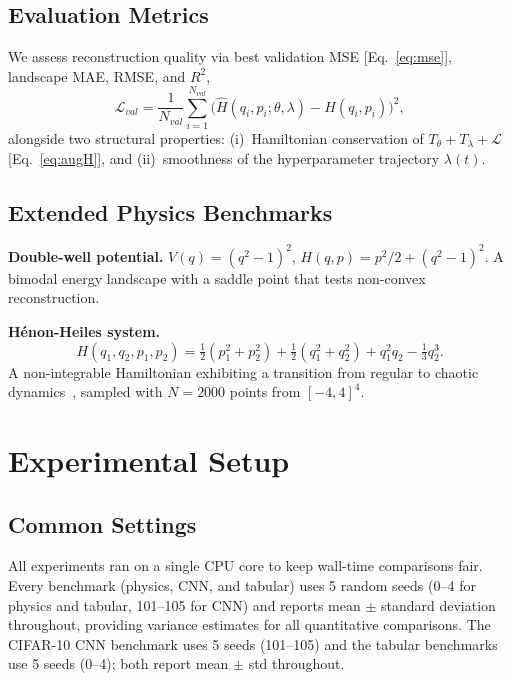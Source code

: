 \documentclass[11pt]{article}
\theoremstyle{definition}
\begin{document}
\subsection{Evaluation Metrics}

We assess reconstruction quality via best validation MSE
[Eq.~\eqref{eq:mse}], landscape MAE, RMSE, and $R^2$,
\begin{equation}
\mathcal{L}_{val}
= \frac{1}{N_{val}}\sum_{i=1}^{N_{val}}
  \bigl(\hat{H}(q_i,p_i;\theta,\lambda) - H(q_i,p_i)\bigr)^2,
\label{eq:mse}
\end{equation}
alongside two structural properties: (i)~Hamiltonian conservation of
$T_\theta+T_\lambda+\mathcal{L}$ [Eq.~\eqref{eq:augH}], and
(ii)~smoothness of the hyperparameter trajectory $\lambda(t)$.

\subsection{Extended Physics Benchmarks}

\textbf{Double-well potential.}
$V(q)=(q^2-1)^2$, $H(q,p)=p^2/2+(q^2-1)^2$. A bimodal energy
landscape with a saddle point that tests non-convex reconstruction.

\textbf{H\'{e}non-Heiles system.}
\begin{equation*}
H(q_1,q_2,p_1,p_2) = \tfrac{1}{2}(p_1^2+p_2^2)
 + \tfrac{1}{2}(q_1^2+q_2^2) + q_1^2 q_2 - \tfrac{1}{3}q_2^3.
\end{equation*}
A non-integrable Hamiltonian exhibiting a transition from regular to
chaotic dynamics~\cite{henon1964,offen2022learning}, sampled with
$N=2000$ points from $[-4,4]^4$.


\section{Experimental Setup}
\label{sec:setup}

\subsection{Common Settings}

All experiments ran on a single CPU core to keep wall-time
comparisons fair. Every benchmark (physics, CNN, and tabular) uses
5 random seeds (0--4 for physics and tabular, 101--105 for CNN) and
reports mean $\pm$ standard deviation throughout, providing variance
estimates for all quantitative comparisons. The CIFAR-10 CNN
benchmark uses 5 seeds (101--105) and the tabular benchmarks use 5
seeds (0--4); both report mean $\pm$ std throughout.
\end{document}
